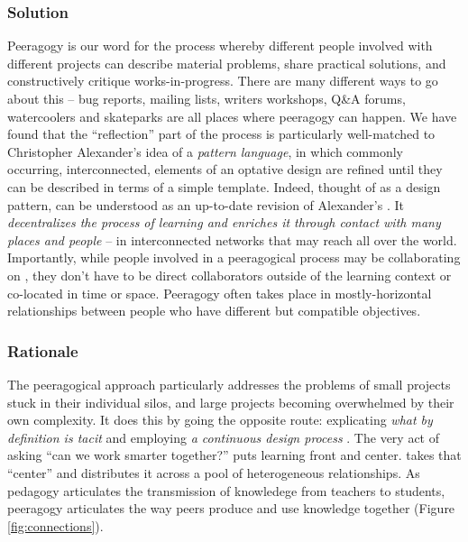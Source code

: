 \subsubsection*{Solution} Peeragogy is our word for the process whereby different people involved with different projects can describe material problems, share practical solutions, and constructively critique works-in-progress.   There are many different ways to go about this -- bug reports, mailing lists, writers workshops, Q\&A forums, watercoolers and skateparks are all places where peeragogy can happen.  We have found that the ``reflection'' part of the process is particularly well-matched to Christopher Alexander's idea of a \emph{pattern language}, in which commonly occurring,  interconnected, elements of an optative design are refined until they can be described in terms of a simple template.  Indeed, thought of as a design pattern,  can be understood as an up-to-date revision of Alexander's  \cite[p. 99]{alexander1977pattern}.  It \emph{decentralizes the process of learning and enriches it through contact with many places and people} -- in interconnected networks that may reach all over the world.   Importantly, while people involved in a peeragogical process may be collaborating on , they don't have to be direct collaborators outside of the learning context or co-located in time or space.  Peeragogy often takes place in mostly-horizontal relationships between people who have different but compatible objectives. 

\subsubsection*{Rationale}
The peeragogical approach  particularly addresses the problems of small projects stuck in their individual silos, and large projects becoming overwhelmed by their own complexity.  It does this by going the opposite route: explicating \emph{what by definition is tacit} and employing \emph{a continuous design process} \cite[pp. 9--10]{schummer2014beyond}.  The very act of asking ``can we work smarter together?'' puts learning front and center.   takes that ``center'' and distributes it across a pool of heterogeneous relationships.  As pedagogy articulates the transmission of knowledege from teachers to students, peeragogy articulates the way peers produce and use knowledge together (Figure \ref{fig:connections}).

